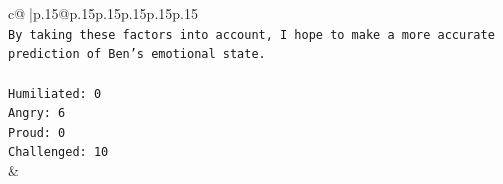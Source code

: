\documentclass{article}
\begin{document}
{\begin{supertabular}{c@{$\;$}|p{.15\linewidth}@{}p{.15\linewidth}p{.15\linewidth}p{.15\linewidth}p{.15\linewidth}p{.15\linewidth}}
{{{\\ 
\texttt{By taking these factors into account, I hope to make a more accurate prediction of Ben's emotional state.} \\
\\ 
\texttt{Humiliated: 0} \\
\texttt{Angry: 6} \\
\texttt{Proud: 0} \\
\texttt{Challenged: 10} \\
            }
        }
    }
    & \\ \\

\end{supertabular}
}
\end{document}
